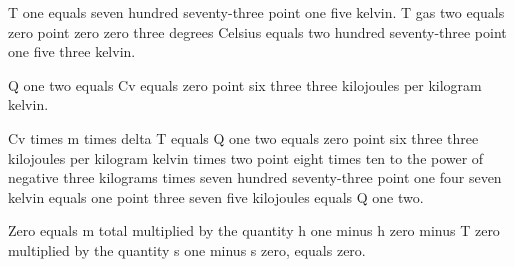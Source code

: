 T one equals seven hundred seventy-three point one five kelvin.  
T gas two equals zero point zero zero three degrees Celsius equals two hundred seventy-three point one five three kelvin.  

Q one two equals Cv equals zero point six three three kilojoules per kilogram kelvin.  

Cv times m times delta T equals Q one two equals zero point six three three kilojoules per kilogram kelvin times two point eight times ten to the power of negative three kilograms times seven hundred seventy-three point one four seven kelvin equals one point three seven five kilojoules equals Q one two.

Zero equals m total multiplied by the quantity h one minus h zero minus T zero multiplied by the quantity s one minus s zero, equals zero.